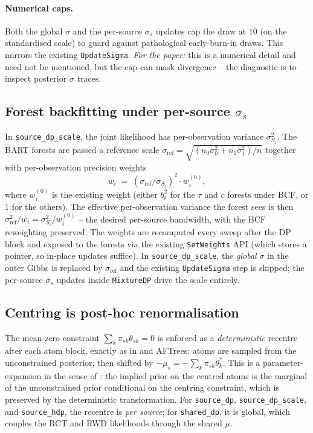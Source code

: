 \documentclass[11pt]{article}
\theoremstyle{plain}
\theoremstyle{definition}
\theoremstyle{remark}
\newcommand{\1}{\mathds{1}}
\begin{document}
\paragraph{Numerical caps.} Both the global $\sigma$ and the per-source $\sigma_s$ updates cap the draw at $10$ (on the standardised scale) to guard against pathological early-burn-in draws. This mirrors the existing \texttt{UpdateSigma}. \emph{For the paper:} this is a numerical detail and need not be mentioned, but the cap can mask divergence -- the diagnostic is to inspect posterior $\sigma$ traces.

\subsection{Forest backfitting under per-source $\sigma_s$}\label{sec:impl-weights}

In \texttt{source\_dp\_scale}, the joint likelihood has per-observation variance $\sigma_{S_i}^2$. The BART forests are passed a reference scale $\sigma_\mathrm{ref} = \sqrt{(n_0 \sigma_0^2 + n_1 \sigma_1^2)/n}$ together with per-observation precision weights
\[
  w_i \;=\; (\sigma_\mathrm{ref} / \sigma_{S_i})^2 \cdot w_i^{(0)},
\]
where $w_i^{(0)}$ is the existing weight (either $b_i^2$ for the $\tau$ and $c$ forests under BCF, or $1$ for the others). The effective per-observation variance the forest sees is then $\sigma_\mathrm{ref}^2 / w_i = \sigma_{S_i}^2 / w_i^{(0)}$ -- the desired per-source bandwidth, with the BCF reweighting preserved. The weights are recomputed every sweep after the DP block and exposed to the forests via the existing \texttt{SetWeights} API (which stores a pointer, so in-place updates suffice). In \texttt{source\_dp\_scale}, the \emph{global} $\sigma$ in the outer Gibbs is replaced by $\sigma_\mathrm{ref}$ and the existing \texttt{UpdateSigma} step is skipped; the per-source $\sigma_s$ updates inside \texttt{MixtureDP} drive the scale entirely.

\subsection{Centring is post-hoc renormalisation}\label{sec:impl-centring}

The mean-zero constraint $\sum_k \pi_{sk} \theta_{sk} = 0$ is enforced as a \emph{deterministic} recentre after each atom block, exactly as in \citet{yang2010semiparametric} and AFTrees: atoms are sampled from the unconstrained posterior, then shifted by $-\mu_s = -\sum_k \pi_{sk}\theta_k^*$. This is a parameter-expansion in the sense of \citet{liu1999parameter}: the implied prior on the centred atoms is the marginal of the unconstrained prior conditional on the centring constraint, which is preserved by the deterministic transformation. For \texttt{source\_dp}, \texttt{source\_dp\_scale}, and \texttt{source\_hdp}, the recentre is \emph{per source}; for \texttt{shared\_dp}, it is global, which couples the RCT and RWD likelihoods through the shared $\mu$.
\end{document}
